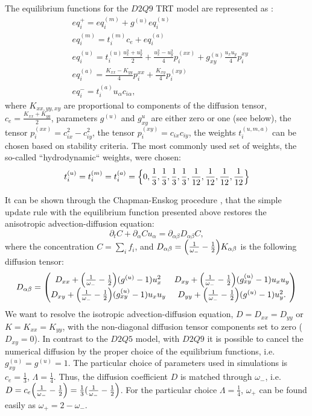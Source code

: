 \documentclass[preprint,12pt]{elsarticle}
\newcommand{\beq}{\begin{equation}}
\newcommand{\feq}{\end{equation}}
\newcommand{\omegaplus}{\omega_{+}}
\newcommand{\omegaminus}{\omega_{-}}
\begin{document}
The equilibrium functions for the $D2Q9$ TRT model are represented as \cite{kuzmin-stability-optimal}:
\begin{equation}
\begin{aligned}
&eq_i^{+}=eq_i^{(m)}+g^{(u)} eq_i^{(u)}\\
&eq_i^{(m)}=t_i^{(m)} c_e+ eq_i^{(a)}\\
&eq_i^{(u)}=t_i^{(u)} \frac{u_x^2+u_y^2}{2}+\frac{u_x^2-u_y^2}{4} p_i^{(xx)}+g_{xy}^{(u)}\frac{u_x
u_y}{4} p_i^{xy}\\
&eq_i^{(a)}=\frac{K_{xx}-K_{yy}}{4} p_i^{xx}+\frac{K_{xy}}{4} p_i^{(xy)}\\
&eq_i^{-}=t_i^{(a)}  u_{\alpha} c_{i\alpha},
\end{aligned}
\end{equation}
where $K_{xx,yy,xy}$ are proportional to components of the diffusion tensor,
$c_e=\frac{K_{xx}+K_{yy}}{2}$, parameters $g^{(u)}$ and $g^{u}_{xy}$ are either zero or one (see
below), the tensor $p_i^{(xx)}=c_{ix}^2-c_{iy}^2$, the tensor $p_i^{(xy)}=c_{ix} c_{iy}$, the
weights
$t_i^{(u,m,a)}$ can be chosen based on stability criteria. The most commonly used set of weights, the so-called
``hydrodynamic`` weights, were chosen:
\begin{equation}
t_i^{(u)}=t_i^{(m)}=t_i^{(a)}=\Bigl\{0,\frac{1}{3},\frac{1}{3},\frac{1}{3},\frac{1}{3},\frac{1}{12},
\frac {1}{12},\frac{1}{12},\frac{1}{12}\Bigr\}
\end{equation}
 
It can be shown through the Chapman-Enskog procedure \cite{chapman}, that the simple update rule
with the equilibrium function presented above restores the anisotropic
advection-diffusion equation:
\beq
\partial_t C+ \partial_{\alpha} C u_{\alpha}=\partial_{\alpha\beta} D_{\alpha\beta} C,
\feq
where the concentration $C=\sum_i{f_i}$, and $D_{\alpha\beta}=\Bigl(\frac{1}{\omegaminus}-\frac{1}{2}\Bigr)K_{\alpha\beta}$ is the
following diffusion tensor:
\begin{equation}
D_{\alpha\beta}=
\begin{pmatrix}
D_{xx} + \Bigl(\frac{1}{\omegaminus}-\frac{1}{2}\Bigr)(g^{(u)}-1) u_x^2 &
D_{xy}+\Bigl(\frac{1}{\omegaminus}-\frac{1}{2}\Bigr)(g_{xy}^{(u)}-1)u_x u_y\\
D_{xy} + \Bigl(\frac{1}{\omegaminus}-\frac{1}{2}\Bigr)(g_{xy}^{(u)}-1) u_x u_y&
D_{yy}+\Bigl(\frac{1}{\omegaminus}-\frac{1}{2}\Bigr)(g^{(u)}-1) u_y^2. 
\end{pmatrix}
\end{equation}
We want to resolve the isotropic advection-diffusion equation, $D=D_{xx}=D_{yy}$ or
$K=K_{xx}=K_{yy}$, with the non-diagonal diffusion tensor components set to zero ($D_{xy}=0$). In
contrast to the $D2Q5$ model, with $D2Q9$ it is
possible to cancel the numerical diffusion by the proper choice
of the equilibrium functions, i.e. $g_{xy}^{(u)}=g^{(u)}=1$.  The particular choice of parameters
used in simulations is $c_e=\frac{1}{3}$, $\Lambda=\frac{1}{4}$. Thus, the diffusion coefficient $D$
is matched through $\omegaminus$, i.e. $D=c_e
\Bigl(\frac{1}{\omegaminus}-\frac{1}{2}\Bigr)=\frac{1}{3}(\frac{1}{\omegaminus}-\frac{1}{2}\Bigr)$.
For the particular choice $\Lambda=\frac{1}{4}$, $\omegaplus$ can be found easily as
 $\omegaplus=2-\omegaminus$.  
\end{document}

